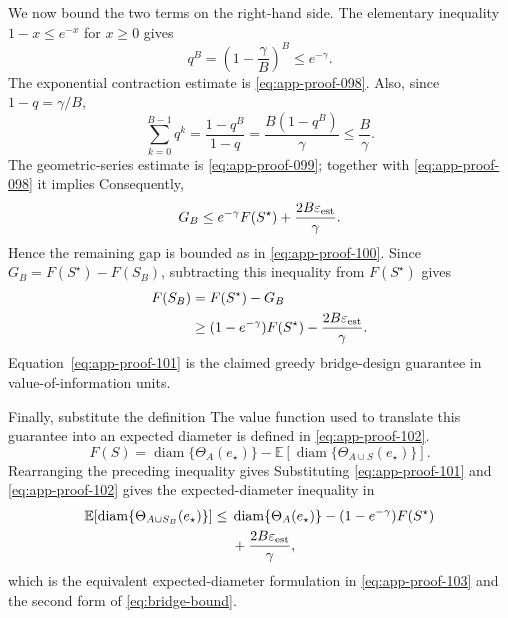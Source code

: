 \documentclass[11pt]{article}
\numberwithin{equation}{section}
\DeclareMathOperator{\diam}{diam}
\newcommand{\E}{\mathbb E}
\newcommand{\1}{\mathbf 1}
\newcommand{\eps}{\varepsilon}
\begin{document}
We now bound the two terms on the right-hand side.  The elementary
inequality \(1-x\le e^{-x}\) for \(x\ge0\) gives
\begin{equation}
\label{eq:app-proof-098}
q^B
  =
  \left(1-\frac{\gamma}{B}\right)^B
  \le e^{-\gamma}.
\end{equation}
The exponential contraction estimate is \eqref{eq:app-proof-098}.
Also, since \(1-q=\gamma/B\),
\begin{equation}
\label{eq:app-proof-099}
\sum_{k=0}^{B-1}q^k
  =
  \frac{1-q^B}{1-q}
  =
  \frac{B(1-q^B)}{\gamma}
  \le
  \frac{B}{\gamma}.
\end{equation}
The geometric-series estimate is \eqref{eq:app-proof-099}; together with
\eqref{eq:app-proof-098} it implies
Consequently,
\begin{equation}
\label{eq:app-proof-100}
G_B
  \le
  e^{-\gamma}F(S^\star)
  +
  \frac{2B\eps_{\rm est}}{\gamma}.
\end{equation}
Hence the remaining gap is bounded as in \eqref{eq:app-proof-100}.
Since \(G_B=F(S^\star)-F(S_B)\), subtracting this inequality from
\(F(S^\star)\) gives
\begin{equation}
\label{eq:app-proof-101}
\begin{aligned}
  F(S_B)
  &=
  F(S^\star)-G_B\\
  &\ge
  (1-e^{-\gamma})F(S^\star)
  -
  \frac{2B\eps_{\rm est}}{\gamma}.
\end{aligned}
\end{equation}
Equation~\eqref{eq:app-proof-101} is the claimed greedy bridge-design
guarantee in value-of-information units.

Finally, substitute the definition
The value function used to translate this guarantee into an expected diameter
is defined in \eqref{eq:app-proof-102}.
\begin{equation}
\label{eq:app-proof-102}
F(S)
  =
  \diam\{\Theta_A(e_\star)\}
  -
  \E\!\left[
    \diam\{\Theta_{A\cup S}(e_\star)\}
  \right].
\end{equation}
Rearranging the preceding inequality gives
Substituting \eqref{eq:app-proof-101} and \eqref{eq:app-proof-102} gives the
expected-diameter inequality in
\begin{equation}
\label{eq:app-proof-103}
\begin{aligned}
  \E\!\left[
    \diam\{\Theta_{A\cup S_B}(e_\star)\}
  \right]
  \le{}&
  \diam\{\Theta_A(e_\star)\}
  -
  (1-e^{-\gamma})F(S^\star)\\
  &+
  \frac{2B\eps_{\rm est}}{\gamma},
\end{aligned}
\end{equation}
which is the equivalent expected-diameter formulation in
\eqref{eq:app-proof-103} and the second form of \eqref{eq:bridge-bound}.
\end{document}

